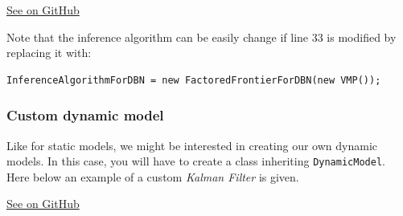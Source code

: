 \documentclass[10pt,a4paper]{article}
\begin{document}
\href{https://github.com/amidst/tutorial/blob/master/src/main/java/eu/amidst/tutorial/usingAmidst/examples/DynamicModelInference.java}{See on GitHub}


Note that the inference algorithm can be easily change if line 33 is modified by replacing it with:

\begin{verbatim}
InferenceAlgorithmForDBN = new FactoredFrontierForDBN(new VMP());
\end{verbatim}


\subsubsection{Custom dynamic model}\label{sec:lvmodels:dynamic:custom}

Like for static models, we might be interested in creating our own dynamic models. In this case, you will have to create a class inheriting \texttt{DynamicModel}. Here below an example of a custom \textit{Kalman Filter} is given.

\href{https://github.com/amidst/tutorial/blob/master/src/main/java/eu/amidst/tutorial/usingAmidst/practice/CustomKalmanFilter.java}{See on GitHub}
\end{document}
